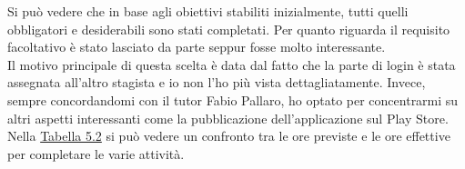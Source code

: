 \newpage

\noindent Si può vedere che in base agli obiettivi stabiliti inizialmente, tutti quelli obbligatori e desiderabili sono stati completati.
Per quanto riguarda il requisito facoltativo è stato lasciato da parte seppur fosse molto interessante.\\
Il motivo principale di questa scelta è data dal fatto che la parte di login è stata assegnata all'altro stagista e io non l'ho più vista dettagliatamente.
Invece, sempre concordandomi con il tutor Fabio Pallaro, ho optato per concentrarmi su altri aspetti interessanti come la pubblicazione dell'applicazione sul Play Store.\\
Nella \hyperref[tab:Confronto tra ore previste e ore effettive]{Tabella 5.2} si può vedere un confronto tra le ore previste e le ore effettive per completare le varie attività.

